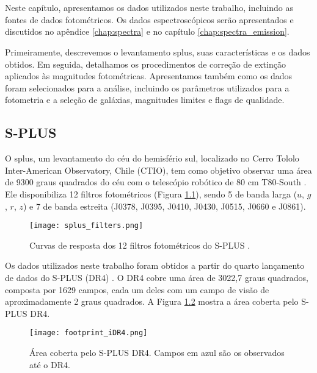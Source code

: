 \chapter{\chapternamedatabase}\label{cap:database}

Neste capítulo, apresentamos os dados utilizados neste trabalho, incluindo as fontes de dados fotométricos. Os dados espectroscópicos serão apresentados e discutidos no apêndice \ref{chap:spectra} e no capítulo \ref{chap:spectra_emission}. 

Primeiramente, descrevemos o levantamento \ac{splus}, suas características e os dados obtidos. Em seguida, detalhamos os procedimentos de correção de extinção aplicados às magnitudes fotométricas. Apresentamos também como os dados foram selecionados para a análise, incluindo os parâmetros utilizados para a fotometria e a seleção de galáxias, magnitudes limites e flags de qualidade.

\section{S-PLUS}
O \ac{splus}, um levantamento do céu do hemisfério sul, localizado no Cerro Tololo Inter-American Observatory, Chile (CTIO), tem como objetivo observar uma área de 9300 graus quadrados do céu com o telescópio robótico de 80 cm T80-South \citep{oliveira2019splus}. Ele disponibiliza 12 filtros fotométricos (Figura \ref{splus_filters}), sendo 5 de banda larga ($u$, $g$, $r$, $z$) e 7 de banda estreita (J0378, J0395, J0410, J0430, J0515, J0660 e J0861).

\begin{figure}[!ht]
    \begin{center}
    \texttt{[image: splus\_filters.png]}
    \caption[]{Curvas de resposta dos 12 filtros fotométricos do S-PLUS \citep{splus_DR4_footprint}.}
    \label{splus_filters}
    \end{center}
\end{figure}

Os dados utilizados neste trabalho foram obtidos a partir do quarto lançamento de dados do S-PLUS (\ac{DR4}) \citep{herpich2024fourthsplusdatarelease}. O DR4 cobre uma área de 3022,7 graus quadrados, composta por 1629 campos, cada um deles com um campo de visão de aproximadamente 2 graus quadrados. A Figura \ref{footprint_iDR4} mostra a área coberta pelo S-PLUS \ac{DR4}.

\begin{figure}[!ht]
    \begin{center}
    \texttt{[image: footprint\_iDR4.png]}
    \caption[]{Área coberta pelo S-PLUS DR4. Campos em azul são os observados até o DR4.}
    \label{footprint_iDR4}
    \end{center}
\end{figure}


